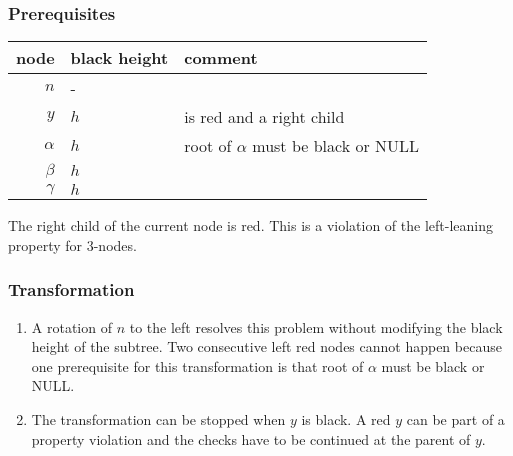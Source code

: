 \documentclass[a4paper,10pt,twoside]{article}
\begin{document}
\subsubsection{Prerequisites}

\begin{center}
\begin{tabular}{|r||l|l|}
\hline
node		&	black height	&	comment	\\
\hline
\hline
$n$		&	-	&		\\\hline
$y$		&	$h$	&	is red and a right child	\\\hline
$\alpha$	&	$h$	&	root of $\alpha$ must be black or NULL	\\\hline
$\beta$		&	$h$	&		\\\hline
$\gamma$	&	$h$	&		\\\hline
\end{tabular}
\end{center}

The right child of the current node is red. This is a violation of the
left-leaning property for 3-nodes.

\begin{center}
\end{center}

\subsubsection{Transformation}

\begin{enumerate}
\item A rotation of $n$ to the left resolves this problem without modifying the
black height of the subtree. Two consecutive left red nodes cannot happen
because one prerequisite for this transformation is that root of $\alpha$ must
be black or NULL.

\begin{center}
\end{center}


\item The transformation can be stopped when $y$ is black. A red $y$ can be part
of a property violation and the checks have to be continued at the parent of
$y$.

\end{enumerate}
\end{document}
